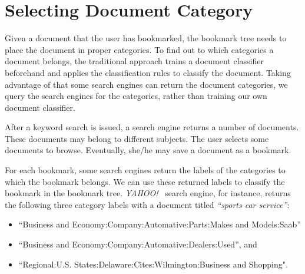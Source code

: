 \section{Selecting Document Category}
\label{sec-get-labels}

Given a document that the user has bookmarked, the bookmark
tree needs to place the document in proper categories.
To find out to which categories a document belongs,
the traditional approach trains a document classifier
beforehand and applies the classification rules to
classify the document. Taking advantage of that some
search engines can return the document categories, we query
the search engines for the categories,
rather than training our own document classifier.

After a keyword search is issued, a search engine
returns a number of documents. These documents may
belong to different subjects. The user selects some
documents to browse.  Eventually, she/he may save 
a document as a bookmark.

For each bookmark, some search engines return the
labels of the categories to which the bookmark belongs. We can use these
returned labels to classify the bookmark in the bookmark tree.
{\it YAHOO!}~ search engine, for instance,
returns the following three category labels with 
a document titled {\it ``sports car service''}:
\begin{itemize}
\item ``Business and Economy:Company:Automative:Parts:Makes and Models:Saab''
\item ``Business and Economy:Company:Automative:Dealers:Used'', and
\item ``Regional:U.S. States:Delaware:Cites:Wilmington:Business and Shopping".
\end{itemize}

